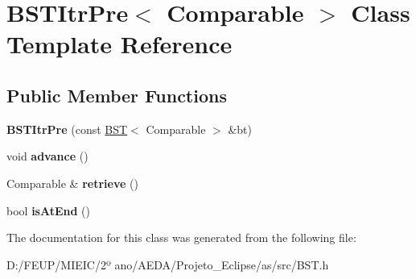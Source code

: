 \hypertarget{class_b_s_t_itr_pre}{}\section{B\+S\+T\+Itr\+Pre$<$ Comparable $>$ Class Template Reference}
\label{class_b_s_t_itr_pre}
\subsection*{Public Member Functions}
\begin{DoxyCompactItemize}
\item 
\mbox{\label{class_b_s_t_itr_pre_a11b1cd4e783f153b9c1b64ce2ec8077e}} 
{\bfseries B\+S\+T\+Itr\+Pre} (const \hyperlink{class_b_s_t}{B\+ST}$<$ Comparable $>$ \&bt)
\item 
\mbox{\label{class_b_s_t_itr_pre_a7a743d66a842018fd833fb2b0737254d}} 
void {\bfseries advance} ()
\item 
\mbox{\label{class_b_s_t_itr_pre_af40033e97f63bf025c2e33a9fdce4c43}} 
Comparable \& {\bfseries retrieve} ()
\item 
\mbox{\label{class_b_s_t_itr_pre_ae282a7b9ffa9d250bb0f6a6d79f6e8d0}} 
bool {\bfseries is\+At\+End} ()
\end{DoxyCompactItemize}


The documentation for this class was generated from the following file\+:\begin{DoxyCompactItemize}
\item 
D\+:/\+F\+E\+U\+P/\+M\+I\+E\+I\+C/2º ano/\+A\+E\+D\+A/\+Projeto\+\_\+\+Eclipse/as/src/B\+S\+T.\+h\end{DoxyCompactItemize}
